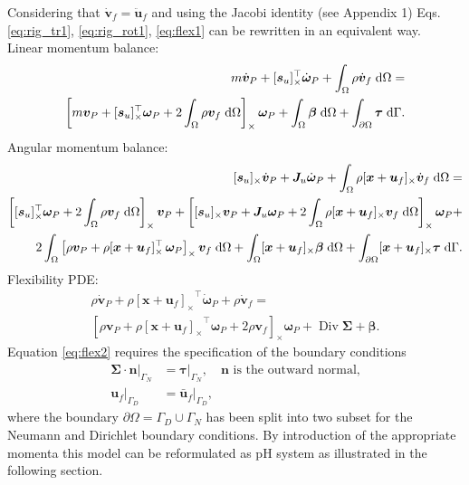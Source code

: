 \documentclass{svjour3}                     %
\DeclareMathOperator*{\Div}{Div}
\newcommand{\crmat}[1]{\ensuremath{[#1]_{\times}}}
\begin{document}
Considering that $\dot{\bm{v}}_f = \ddot{\bm{u}}_f$ and using the Jacobi identity (see Appendix 1) Eqs. \eqref{eq:rig_tr1}, \eqref{eq:rig_rot1}, \eqref{eq:flex1} can be rewritten in an equivalent way. \\
Linear momentum balance:
\begin{equation}
\label{eq:rig_tr2}
	\begin{split}
	m\dot{\bm{v}}_P + \crmat{\bm{s}_u}^\top \dot{\bm{\omega}}_P +   \int_{\Omega} \rho \dot{\bm{v}}_f \d{\Omega}  = \\
	\left[m \bm{v}_P + \crmat{\bm{s}_u}^\top \bm\omega_P +2 \int_{\Omega} \rho \bm{v}_f \d{\Omega} \right]_\times \bm\omega_P +  \int_{\Omega} \bm\beta \d{\Omega} + \int_{\partial \Omega} \bm\tau \d{\Gamma}.
	\end{split}
\end{equation}
Angular momentum balance:
\begin{equation}
\label{eq:rig_rot2}
\begin{split}
\crmat{\bm{s}_u} \dot{\bm{v}}_P  + \bm{J}_u \dot{\bm\omega}_P + \int_{\Omega} \rho \crmat{\bm{x}+\bm{u}_f} \dot{\bm{v}}_f \d{\Omega} = \\
\left[\crmat{\bm{s}_u}^\top \bm\omega_P + 2 \int_{\Omega} \rho \bm{v}_f \d{\Omega} \right]_\times \bm{v}_P + \left[\crmat{\bm{s}_u} \bm{v}_P + \bm{J}_u \bm\omega_P + 2 \int_{\Omega} \rho \crmat{\bm{x}+\bm{u}_f} {\bm{v}}_f \d{\Omega} \right]_\times \bm\omega_P + 
\\
2 \int_{\Omega} \left[\rho \bm{v}_P + \rho \crmat{\bm{x}+\bm{u}_f}^\top \, \bm\omega_P \right]_\times \bm{v}_f \d{\Omega} + \int_{\Omega}\crmat{\bm{x}+\bm{u}_f} \bm\beta \d{\Omega} + \int_{\partial \Omega}\crmat{\bm{x}+\bm{u}_f} \bm{\tau} \d{\Gamma}.
\end{split}
\end{equation}
Flexibility PDE:
\begin{equation}
\label{eq:flex2}
\begin{split}
\rho \dot{\bm{v}}_P + \rho \crmat{\bm{x}+\bm{u}_f}^\top \dot{\bm\omega}_P  + \rho \dot{\bm{v}}_f = \\
\left[\rho \bm{v}_P + \rho \crmat{\bm{x}+\bm{u}_f}^\top \bm\omega_P + 2 \rho \bm{v}_f \right]_\times \bm\omega_P + \Div{\bm\Sigma} + \bm\beta.
\end{split}
\end{equation}
Equation \eqref{eq:flex2}  requires the specification of the boundary conditions
\begin{equation}
\begin{aligned}
\bm\Sigma \cdot \bm{n}|_{\Gamma_N} &= \bm\tau|_{\Gamma_N}, \quad \text{$\bm{n}$ is the outward normal,} \\
\bm{u}_f|_{\Gamma_D} &= \bm{\bar{u}}_f|_{\Gamma_D},
\end{aligned}
\end{equation}
where the boundary $\partial \Omega = \Gamma_D \cup \Gamma_N$ has been split into two subset for the Neumann and Dirichlet boundary conditions. By introduction of the appropriate momenta this model can be reformulated as pH system as illustrated in the following section.
\end{document}
